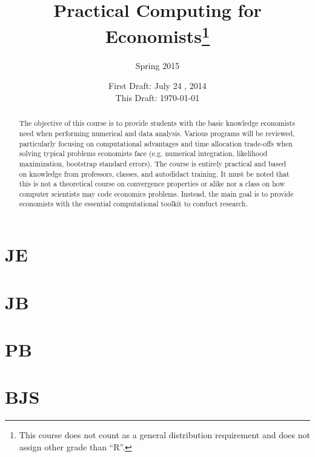 




\title{\textbf{Practical Computing for Economists}\footnote{This course does not count as a general distribution requirement and does not assign other grade than ``R''. }}
\author{Spring 2015}
\date{First Draft: July 24 , 2014 \\ This Draft: \today}
\maketitle

\begin{abstract}
\noindent The objective of this course is to provide students with the basic knowledge economists need when performing numerical and data analysis. Various programs will be reviewed, particularly focusing on computational advantages and time allocation trade-offs when solving typical problems economists face (e.g. numerical integration, likelihood maximization, bootstrap standard errors). The course is entirely practical and based on knowledge from professors, classes, and autodidact training. It must be noted that this is not a theoretical course on convergence properties or alike nor a class on how computer scientists may code economics problems. Instead, the main goal is to provide economists with the essential computational toolkit to conduct research.
\end{abstract}


\section{JE}

\section{JB}

\section{PB}

\section{BJS}

